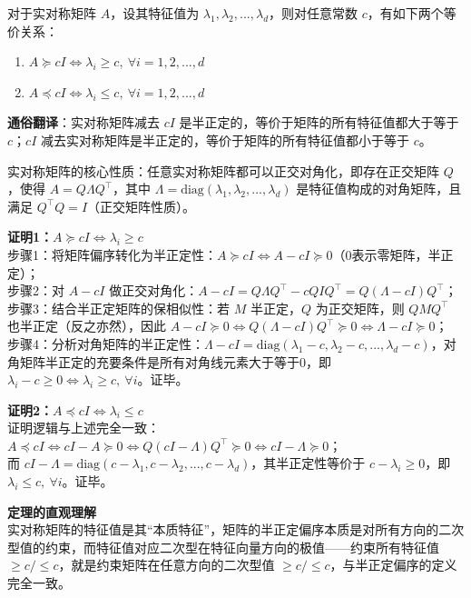 \documentclass[10pt]{article}
\numberwithin{equation}{section}
\theoremstyle{plain}
\theoremstyle{definition}
\theoremstyle{remark}
\begin{document}
\begin{RemarkBox}[实对称矩阵偏序等价性]
对于实对称矩阵 $A$，设其特征值为 $\lambda_1, \lambda_2, ..., \lambda_d$，则对任意常数 $c$，有如下两个等价关系：
\begin{enumerate}[label=\arabic*., leftmargin=*]
    \item $\displaystyle A \succeq cI \iff \lambda_i \geq c,\ \forall i=1,2,...,d$
    \item $\displaystyle A \preceq cI \iff \lambda_i \leq c,\ \forall i=1,2,...,d$
\end{enumerate}
\textbf{通俗翻译}：实对称矩阵减去 $cI$ 是半正定的，等价于矩阵的所有特征值都大于等于 $c$；$cI$ 减去实对称矩阵是半正定的，等价于矩阵的所有特征值都小于等于 $c$。
\end{RemarkBox}

\begin{AnalysisBox}[定理证明]
实对称矩阵的核心性质：任意实对称矩阵都可以正交对角化，即存在正交矩阵 $Q$，使得 $A = Q\Lambda Q^\top$，其中 $\Lambda = \text{diag}(\lambda_1, \lambda_2, ..., \lambda_d)$ 是特征值构成的对角矩阵，且满足 $Q^\top Q = I$（正交矩阵性质）。

\textbf{证明1：$A \succeq cI \iff \lambda_i \geq c$}\\
步骤1：将矩阵偏序转化为半正定性：$A \succeq cI \iff A - cI \succeq 0$（$0$表示零矩阵，半正定）；\\
步骤2：对 $A - cI$ 做正交对角化：$A - cI = Q\Lambda Q^\top - cQIQ^\top = Q(\Lambda - cI)Q^\top$；\\
步骤3：结合半正定矩阵的保相似性：若 $M$ 半正定，$Q$ 为正交矩阵，则 $QMQ^\top$ 也半正定（反之亦然），因此 $A - cI \succeq 0 \iff Q(\Lambda - cI)Q^\top \succeq 0 \iff \Lambda - cI \succeq 0$；\\
步骤4：分析对角矩阵的半正定性：$\Lambda - cI = \text{diag}(\lambda_1 - c, \lambda_2 - c, ..., \lambda_d - c)$，对角矩阵半正定的充要条件是所有对角线元素大于等于0，即 $\lambda_i - c \geq 0 \iff \lambda_i \geq c,\ \forall i$。证毕。

\textbf{证明2：$A \preceq cI \iff \lambda_i \leq c$}\\
证明逻辑与上述完全一致：
$A \preceq cI \iff cI - A \succeq 0 \iff Q(cI - \Lambda)Q^\top \succeq 0 \iff cI - \Lambda \succeq 0$；\\
而 $cI - \Lambda = \text{diag}(c - \lambda_1, c - \lambda_2, ..., c - \lambda_d)$，其半正定性等价于 $c - \lambda_i \geq 0$，即 $\lambda_i \leq c,\ \forall i$。证毕。
\end{AnalysisBox}

\textbf{定理的直观理解}\\
实对称矩阵的特征值是其“本质特征”，矩阵的半正定偏序本质是对所有方向的二次型值的约束，而特征值对应二次型在特征向量方向的极值——约束所有特征值 $\geq c/\leq c$，就是约束矩阵在任意方向的二次型值 $\geq c/\leq c$，与半正定偏序的定义完全一致。
\end{document}
